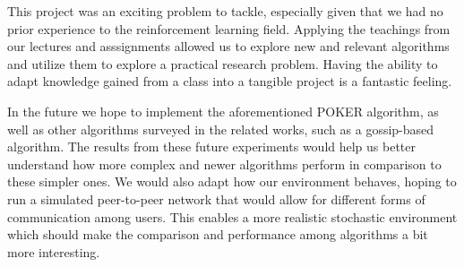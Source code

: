 \documentclass{article}
\begin{document}
This project was an exciting problem to tackle, especially given that we had no prior experience to the reinforcement learning field. Applying the teachings from our 
lectures and asssignments allowed us to explore new and relevant algorithms and utilize them to explore a practical research problem. Having the ability to adapt knowledge 
gained from a class into a tangible project is a fantastic feeling. 


In the future we hope to implement the aforementioned POKER algorithm, as well as other algorithms surveyed in the related works, such as a gossip-based algorithm. The 
results from these future experiments would help us better understand how more complex and newer algorithms perform in comparison to these simpler ones. We would also adapt 
how our environment behaves, hoping to run a simulated peer-to-peer network that would allow for different forms of communication among users. This enables a more realistic 
stochastic environment which should make the comparison and performance among algorithms a bit more interesting. 



\end{document}
